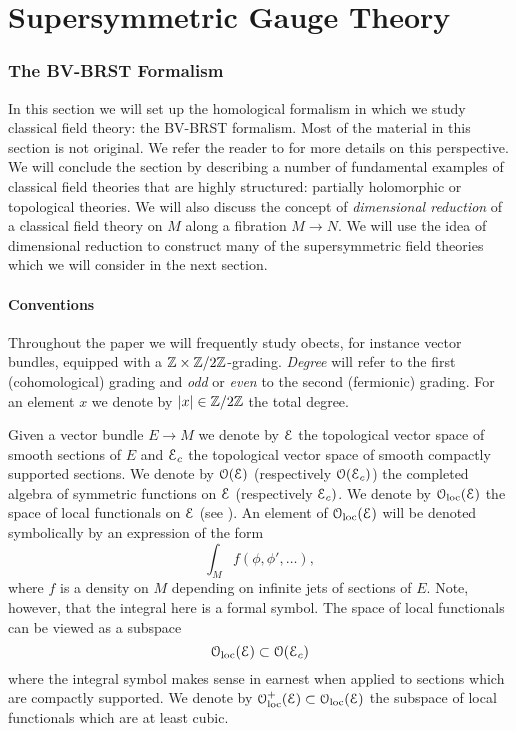 \documentclass[10pt, oneside]{article}
\begin{document}
\part{Supersymmetric Gauge Theory}

\section{The BV-BRST Formalism}

In this section we will set up the homological formalism in which we study classical field theory: the BV-BRST formalism.  Most of the material in this section is not original.  We refer the reader to \cite{CostelloBook, Book2} for more details on this perspective.  We will conclude the section by describing a number of fundamental examples of classical field theories that are highly structured: partially holomorphic or topological theories.  We will also discuss the concept of \emph{dimensional reduction} of a classical field theory on $M$ along a fibration $M \to N$.  We will use the idea of dimensional reduction to construct many of the supersymmetric field theories which we will consider in the next section.  

\subsection{Conventions}
Throughout the paper we will frequently study obects, for instance vector bundles, equipped with a $\mathbb Z\times\mathbb Z/2\mathbb Z$-grading. \emph{Degree} will refer to the first (cohomological) grading and \emph{odd} or \emph{even} to the second (fermionic) grading.  For an element $x$ we denote by $|x|\in\mathbb Z/2\mathbb Z$ the total degree.

Given a vector bundle $E\rightarrow M$ we denote by $\mathcal E$ the topological vector space of smooth sections of $E$ and $\mathcal E_c$ the topological vector space of smooth compactly supported sections.
We denote by $\mathcal O(\mathcal E)$ (respectively $\mathcal O(\mathcal E_c)$) the completed algebra of symmetric functions on $\mathcal E$ (respectively $\mathcal E_c)$. 
We denote by $\mathcal{O}_{\rm loc}(\mathcal E)$ the space of local functionals on $\mathcal E$ (see \cite[Definition 4.5.1.1]{Book2}). An element of $\mathcal{O}_{\rm loc}(\mathcal E)$ will be denoted symbolically by an expression of the form
\[\int_M f (\phi, \phi', \dots),\]
where $f$ is a density on $M$ depending on infinite jets of sections of $E$. Note, however, that the integral here is a formal symbol. 
The space of local functionals can be viewed as a subspace
\[
\mathcal{O}_{\rm loc}(\mathcal E) \subset \mathcal O(\mathcal E_c)
\]
where the integral symbol makes sense in earnest when applied to sections which are compactly supported.
We denote by $\mathcal{O}_{\rm loc}^+(\mathcal E)\subset \mathcal{O}_{\rm loc}(\mathcal E)$ the subspace of local functionals which are at least cubic.
\end{document}
